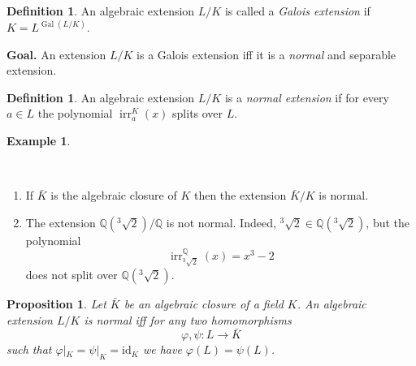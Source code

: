 \documentclass[12pt, letterpaper, oneside]{article}
\theoremstyle{plain}
\newtheorem{proposition}[theorem]{Proposition}
\theoremstyle{definition}
\newtheorem{definition}[theorem]{Definition}
\newtheorem{example}[theorem]{Example}
\newcommand{\Q}{{\mathbb Q}}
\newcommand{\id}{\mathrm{id}}
\newcommand{\irr}{\operatorname{irr}}
\newcommand{\Gal}{\operatorname{Gal}}
\newcommand{\benu}{\begin{enumerate}}
\newcommand{\eenu}{\end{enumerate}}
\newcommand{\vs}{\vskip 5mm}
\begin{document}
\vs\vs

\begin{definition}
An algebraic extension $L/K$ is called a \emph{Galois extension} if 
$K = L^{\Gal(L/K)}$.
\end{definition}


\vs\vs


\textbf{Goal.} An extension $L/K$ is a Galois extension iff it is a \emph{normal}  and 
separable extension. 



\vs\vs 


\begin{definition}
An algebraic extension $L/K$ is a \emph{normal extension} if for every $a\in L$ the 
polynomial $\irr^{K}_{a}(x)$ splits over $L$. 
\end{definition}


\vs\vs

\begin{example}\ 

\vskip -13mm

\ 
\benu
\item If $\bar{K}$ is the algebraic closure of $K$ then the extension $\bar{K}/K$ 
is normal. 

\item The extension $\Q(^{3}\!\!\!\sqrt{2})/\Q$ is not normal. Indeed, 
$^{3}\!\!\!\sqrt{2}\in \Q(^{3}\!\!\!\sqrt{2})$, but the polynomial 
$$\irr^{\Q}_{^{3}\!\!\!\sqrt{2}}(x) = x^{3}-2$$
does not split over $ \Q(^{3}\!\!\!\sqrt{2})$. 
\eenu

\end{example}


\vs\vs

\begin{proposition}
\label{PROP_NORMALEXTEMB}
Let $\bar{K}$ be an algebraic closure of a field $K$. An algebraic extension $L/K$
is normal iff for any two homomorphisms 
$$\varphi, \psi\colon L \to \bar{K}$$
such that $\varphi|_{K} = \psi|_{K} = \id_{K}$ we have $\varphi(L)= \psi(L)$.  
\end{proposition}


\vs
\end{document}
